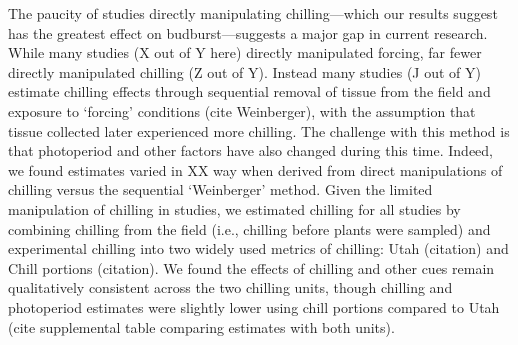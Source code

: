 \documentclass{article}
\begin{document}
\par The paucity of studies directly manipulating chilling---which our results suggest has the greatest effect on budburst---suggests a major gap in current research. While many studies (X out of Y here) directly manipulated forcing, far fewer directly manipulated chilling (Z out of Y). Instead many studies (J out of Y) estimate chilling effects through sequential removal of tissue from the field and exposure to `forcing' conditions (cite Weinberger), with the assumption that tissue collected later experienced more chilling. The challenge with this method is that photoperiod and other factors have also changed during this time. Indeed, we found estimates varied in XX way when derived from direct manipulations of chilling versus the sequential `Weinberger' method. Given the limited manipulation of chilling in studies, we estimated chilling for all studies by combining chilling from the field (i.e., chilling before plants were sampled) and experimental chilling into two widely used metrics of chilling: Utah (citation) and Chill portions (citation). We found the effects of chilling and other cues remain qualitatively consistent across the two chilling units, though chilling and photoperiod estimates were slightly lower using chill portions compared to Utah (cite supplemental table comparing estimates with both units).  %

\end{document}
